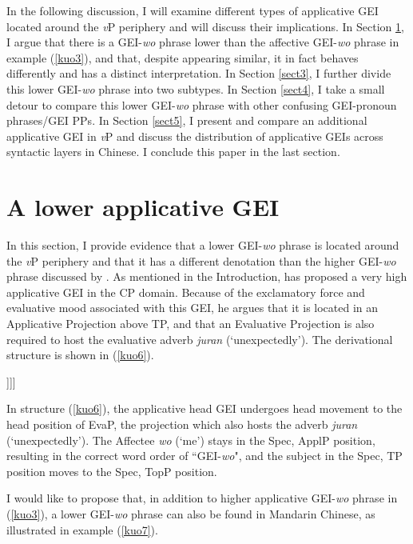 \documentclass[output=paper,colorlinks,citecolor=brown]{langscibook}
\begin{document}
\z

In the following discussion, I will examine different types of applicative GEI located around the \textit{v}P periphery and will discuss their implications. In Section \ref{sect2}, I argue that there is a GEI-\textit{wo} phrase lower than the affective GEI-\textit{wo} phrase in example (\ref{kuo3}), and that, despite appearing similar, it in fact behaves differently and has a distinct interpretation. In Section \ref{sect3}, I further divide this lower GEI-\textit{wo} phrase into two subtypes. In Section \ref{sect4}, I take a small detour to compare this lower GEI-\textit{wo} phrase with other confusing GEI-pronoun phrases/GEI PPs. In Section \ref{sect5}, I present and compare an additional applicative GEI in \textit{v}P and discuss the distribution of applicative GEIs across syntactic layers in Chinese. I conclude this paper in the last section.

\section{A lower applicative GEI}\label{sect2}

In this section, I provide evidence that a lower GEI-\textit{wo} phrase is located around the \textit{v}P periphery and that it has a different denotation than the higher GEI-\textit{wo} phrase discussed by \citet{Tsai2017}. As mentioned in the Introduction, \citet{Tsai2017} has proposed a very high applicative GEI in the CP domain. Because of the
exclamatory force and evaluative mood associated with this GEI, he argues that it is located in an Applicative Projection above TP, and that an Evaluative Projection is also required to host the evaluative adverb \textit{juran} (`unexpectedly'). The derivational structure is shown in (\ref{kuo6}).

\ea
\label{kuo6}
\glt [{\scriptsize TopP} Zhangsan{\scriptsize i}  [{\scriptsize EvaP}   juran gei{\scriptsize j}  [{\scriptsize ApplP}  wo  t{\scriptsize j}  [{\scriptsize TP}  t{\scriptsize i}  ......]]]]\\  
\z

In structure (\ref{kuo6}), the applicative head GEI undergoes head movement to the head position of EvaP, the projection which also hosts the adverb \textit{juran} (`unexpectedly'). The Affectee \textit{wo} (`me') stays in the Spec, ApplP position, resulting in the correct word order of “GEI-\textit{wo}", and the subject in the Spec, TP position moves to the Spec, TopP position.\par 
I would like to propose that, in addition to  \citeyear{Tsai2017} higher applicative GEI-\textit{wo} phrase in (\ref{kuo3}), a lower GEI-\textit{wo} phrase can also be found in Mandarin Chinese, as illustrated in example (\ref{kuo7}).
\end{document}
